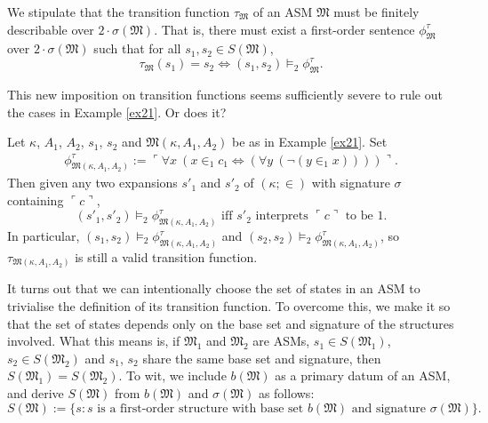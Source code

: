\documentclass[12pt]{article}
\numberwithin{equation}{section}
\begin{document}
We stipulate that the transition function $\tau_{\mathfrak{M}}$ of an ASM $\mathfrak{M}$ must be finitely describable over $2 \cdot \sigma(\mathfrak{M})$. That is, there must exist a first-order sentence $\phi^{\tau}_{\mathfrak{M}}$ over $2 \cdot \sigma(\mathfrak{M})$ such that for all $s_1, s_2 \in S(\mathfrak{M})$, 
\begin{equation*}
    \tau_{\mathfrak{M}}(s_1) = s_2 \iff (s_1, s_2) \models_2 \phi^{\tau}_{\mathfrak{M}} \text{.}
\end{equation*}

This new imposition on transition functions seems sufficiently severe to rule out the cases in Example \ref{ex21}. Or does it?

\begin{ex}
Let $\kappa$, $A_1$, $A_2$, $s_1$, $s_2$ and $\mathfrak{M}(\kappa, A_1, A_2)$ be as in Example \ref{ex21}. Set 
\begin{gather*}
    \phi^{\tau}_{\mathfrak{M}(\kappa, A_1, A_2)} := \ulcorner \forall x \ (x \in_1 c_1 \iff (\forall y \ (\neg (y \in_1 x)))) \urcorner \text{.}
\end{gather*}
Then given any two expansions $s'_1$ and $s'_2$ of $(\kappa; \in)$ with signature $\sigma$ containing $\ulcorner c \urcorner$, 
\begin{equation*}
    (s'_1, s'_2) \models_2 \phi^{\tau}_{\mathfrak{M}(\kappa, A_1, A_2)} \text{ iff } s'_2 \text{ interprets } \ulcorner c \urcorner \text{ to be } 1 \text{.}
\end{equation*}
In particular, $(s_1, s_2) \models_2 \phi^{\tau}_{\mathfrak{M}(\kappa, A_1, A_2)}$ and $(s_2, s_2) \models_2 \phi^{\tau}_{\mathfrak{M}(\kappa, A_1, A_2)}$, so $\tau_{\mathfrak{M}(\kappa, A_1, A_2)}$ is still a valid transition function. 
\end{ex}

It turns out that we can intentionally choose the set of states in an ASM to trivialise the definition of its transition function. To overcome this, we make it so that the set of states depends only on the base set and signature of the structures involved. What this means is, if $\mathfrak{M}_1$ and $\mathfrak{M}_2$ are ASMs, $s_1 \in S(\mathfrak{M}_1)$, $s_2 \in S(\mathfrak{M}_2)$ and $s_1$, $s_2$ share the same base set and signature, then $S(\mathfrak{M}_1) = S(\mathfrak{M}_2)$. To wit, we include $b(\mathfrak{M})$ as a primary datum of an ASM, and derive $S(\mathfrak{M})$ from $b(\mathfrak{M})$ and $\sigma(\mathfrak{M})$ as follows: 
\begin{equation*}
    S(\mathfrak{M}) := \{s : s \text{ is a first-order structure with base set } b(\mathfrak{M}) \text{ and signature } \sigma(\mathfrak{M})\} \text{.}
\end{equation*}
\end{document}
